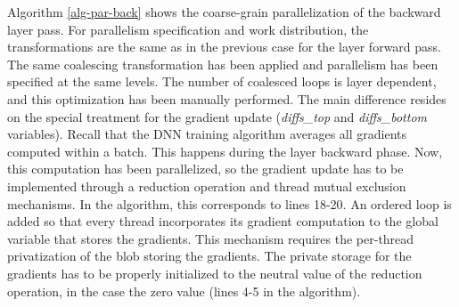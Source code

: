 Algorithm \ref{alg-par-back} shows the coarse-grain parallelization of 
the backward layer pass. For parallelism specification and work 
distribution, the transformations are the same as in the previous 
case for the layer forward pass. The same coalescing transformation has 
been applied and parallelism has been specified at the same levels. 
The number of coalesced loops is layer dependent, and this optimization 
has been manually performed. The main difference resides on the special 
treatment for the gradient update (\emph{diffs\_top} and \emph{diffs\_bottom} 
variables). Recall that the DNN training algorithm averages all gradients 
computed within a batch. This happens during the layer backward phase.
Now, this computation has been parallelized, so the gradient update has 
to be implemented through a reduction operation and thread mutual exclusion 
mechanisms. In the algorithm, this corresponds to lines 18-20. An ordered loop 
is added so that every thread incorporates its gradient computation to 
the global variable that stores the gradients.
This mechanism requires the per-thread privatization of the blob storing 
the gradients. The private storage for the gradients has to be properly 
initialized to the neutral value of the reduction operation, in the case 
the zero value (lines 4-5 in the algorithm). 

